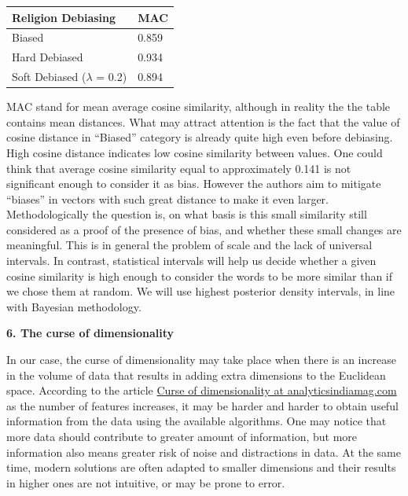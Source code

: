 \documentclass[10pt,dvipsnames,enabledeprecatedfontcommands]{scrartcl}
\begin{document}
\begin{longtable}[]{@{}ll@{}}
\toprule
Religion Debiasing & MAC\tabularnewline
\midrule
\endhead
Biased & 0.859\tabularnewline
Hard Debiased & 0.934\tabularnewline
Soft Debiased (\(\lambda\) = 0.2) & 0.894\tabularnewline
\bottomrule
\end{longtable}

MAC stand for mean average cosine similarity, although in reality the
the table contains mean distances. What may attract attention is the
fact that the value of cosine distance in ``Biased'' category is already
quite high even before debiasing. High cosine distance indicates low
cosine similarity between values. One could think that average cosine
similarity equal to approximately 0.141 is not significant enough to
consider it as bias. However the authors aim to mitigate ``biases'' in
vectors with such great distance to make it even larger.
Methodologically the question is, on what basis is this small similarity
still considered as a proof of the presence of bias, and whether these
small changes are meaningful. This is in general the problem of scale
and the lack of universal intervals. In contrast, statistical intervals
will help us decide whether a given cosine similarity is high enough to
consider the words to be more similar than if we chose them at random.
We will use highest posterior density intervals, in line with Bayesian
methodology.

\textbf{6. The curse of dimensionality}

In our case, the curse of dimensionality may take place when there is an
increase in the volume of data that results in adding extra dimensions
to the Euclidean space. According to the article
\href{https://analyticsindiamag.com/curse-of-dimensionality-and-what-beginners-should-do-to-overcome-it/}{Curse
of dimensionality at analyticsindiamag.com} as the number of features
increases, it may be harder and harder to obtain useful information from
the data using the available algorithms. One may notice that more data
should contribute to greater amount of information, but more information
also means greater risk of noise and distractions in data. At the same
time, modern solutions are often adapted to smaller dimensions and their
results in higher ones are not intuitive, or may be prone to error.
\end{document}
